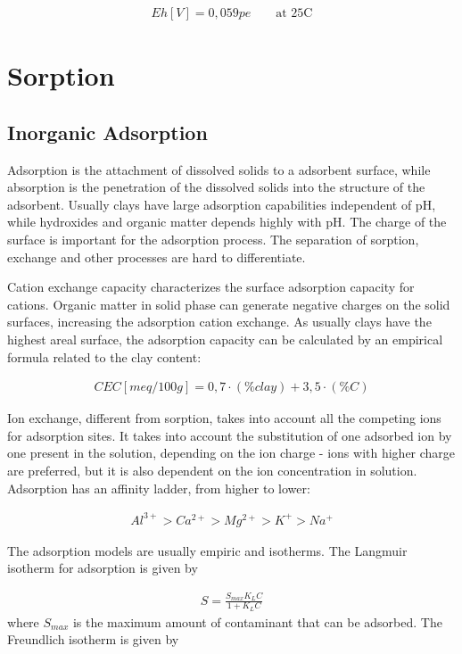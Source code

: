 \documentclass[11pt,twoside]{report}
\begin{document}
\begin{align}
   Eh[V] = 0,059pe \qquad \text{at 25C}
\end{align}

\section{Sorption}
\subsection{Inorganic Adsorption}

Adsorption is the attachment of dissolved solids to a adsorbent surface, while absorption is the penetration of the dissolved solids into the structure of the adsorbent. Usually clays have large adsorption capabilities independent of pH, while hydroxides and organic matter depends highly with pH. The charge of the surface is important for the adsorption process. The separation of sorption, exchange and other processes are hard to differentiate. 

Cation exchange capacity characterizes the surface adsorption capacity for cations. Organic matter in solid phase can generate negative charges on the solid surfaces, increasing the adsorption cation exchange. As usually clays have the highest areal surface, the adsorption capacity can be calculated by an empirical formula related to the clay content:

\begin{align}
   CEC [meq/100g] = 0,7 \cdot (\% clay) + 3,5 \cdot (\% C)
\end{align}


Ion exchange, different from sorption, takes into account all the competing ions for adsorption sites. It takes into account the substitution of one adsorbed ion by one present in the solution, depending on the ion charge - ions with higher charge are preferred, but it is also dependent on the ion concentration in solution. Adsorption has an affinity ladder, from higher to lower:

\begin{align}
   Al^{3+} > Ca^{2+} > Mg^{2+} > K^{+} > Na^{+}
\end{align}

The adsorption models are usually empiric and isotherms. The Langmuir isotherm for adsorption is given by

\begin{align}
   S = \frac{S_{max}K_{L}C}{1 + K_{L}C}
\end{align}
where $S_{max}$ is the maximum amount of contaminant that can be adsorbed. The Freundlich isotherm is given by
\end{document}
